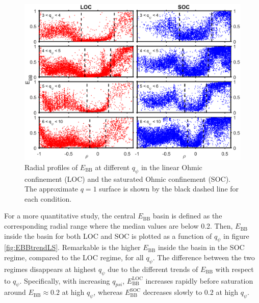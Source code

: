 \begin{figure}[h]
\begin{centering}
\includegraphics[scale=0.65]{fig_EBB_LOCSOC.eps}
\par\end{centering}
\caption{Radial profiles of $E_\mathrm{BB}$ at different $q_{\psi}$ in the linear Ohmic confinement (LOC) and the saturated Ohmic confinement (SOC). The approximate $q = 1$ surface is shown by the black dashed line for each condition.}
\label{fig:ELS}
\end{figure}


For a more quantitative study, the central $E_\mathrm{BB}$ basin is defined as the corresponding radial range where the median values are below 0.2. Then, $E_\mathrm{BB}$ inside the basin for both LOC and SOC is plotted as a function of $q_{\psi}$ in figure \ref{fig:EBBtrendLS}. Remarkable is the higher $E_\mathrm{BB}$ inside the basin in the SOC regime, compared to the LOC regime, for all $q_{\psi}$. The difference between the two regimes disappears at highest $q_{\psi}$ due to the different trends of $E_\mathrm{BB}$ with respect to $q_{\psi}$. Specifically, with increasing $q_{psi}$, $E_\mathrm{BB}^\mathrm{LOC}$ increases rapidly before saturation around $E_\mathrm{BB} \approx 0.2$ at high $q_{\psi}$, whereas $E_\mathrm{BB}^\mathrm{SOC}$ decreases slowly to $0.2$ at high $q_{\psi}$. %


